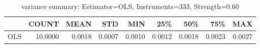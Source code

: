 \begin{table}[ht]
\centering
\caption{variance summary: Estimator=OLS, Instruments=333, Strength=0.60}
\begin{tabular}{lrrrrrrrr}
\toprule
 & COUNT & MEAN & STD & MIN & 25\% & 50\% & 75\% & MAX \\
\midrule
OLS & 10.0000 & 0.0018 & 0.0007 & 0.0010 & 0.0012 & 0.0018 & 0.0023 & 0.0027 \\
\bottomrule
\end{tabular}
\end{table}
